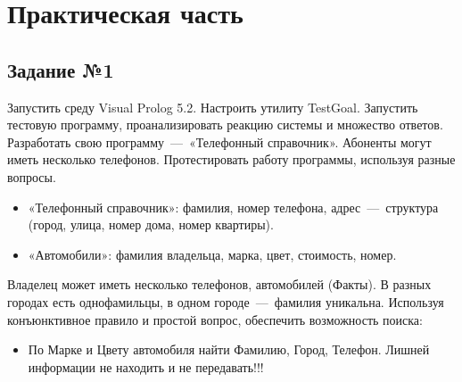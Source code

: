 \setcounter{page}{3}

\chapter{Практическая часть}
\section{Задание №1}
Запустить среду Visual Prolog 5.2. Настроить утилиту TestGoal.
Запустить тестовую программу, проанализировать реакцию системы и множество ответов.
Разработать свою программу~---~«Телефонный справочник». Абоненты могут иметь несколько телефонов. Протестировать работу программы, используя разные вопросы.

\begin{itemize}
 \item «Телефонный справочник»: фамилия, номер телефона, адрес~---~структура (город, улица, номер дома, номер квартиры).
 \item «Автомобили»: фамилия владельца, марка, цвет, стоимость, номер.
\end{itemize}

Владелец может иметь несколько телефонов, автомобилей (Факты). В разных городах есть однофамильцы, в одном городе~---~фамилия уникальна.
Используя конъюнктивное правило и простой вопрос, обеспечить возможность поиска:

\begin{itemize}
 \item По Марке и Цвету автомобиля найти Фамилию, Город, Телефон. Лишней информации не находить и не передавать!!!
\end{itemize}
  
